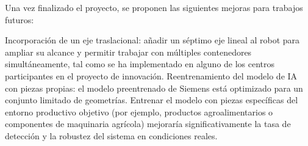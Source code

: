 Una vez finalizado el proyecto, se proponen las siguientes mejoras para trabajos futuros:


Incorporación de un eje traslacional: añadir un séptimo eje lineal al robot para ampliar su alcance y permitir trabajar con múltiples contenedores simultáneamente, tal como se ha implementado en alguno de los centros participantes en el proyecto de innovación.
Reentrenamiento del modelo de IA con piezas propias: el modelo preentrenado de Siemens está optimizado para un conjunto limitado de geometrías. Entrenar el modelo con piezas específicas del entorno productivo objetivo (por ejemplo, productos agroalimentarios o componentes de maquinaria agrícola) mejoraría significativamente la tasa de detección y la robustez del sistema en condiciones reales.
